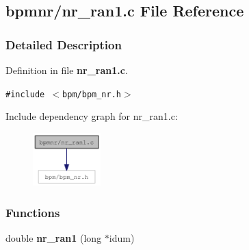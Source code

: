 \subsection{bpmnr/nr\_\-ran1.c File Reference}
\label{nr__ran1_8c}


\subsubsection{Detailed Description}


Definition in file {\bf nr\_\-ran1.c}.

{\tt \#include $<$bpm/bpm\_\-nr.h$>$}\par


Include dependency graph for nr\_\-ran1.c:\nopagebreak
\begin{figure}[H]
\begin{center}
\leavevmode
\includegraphics[width=74pt]{nr__ran1_8c__incl}
\end{center}
\end{figure}
\subsubsection*{Functions}
\begin{CompactItemize}
\item 
double {\bf nr\_\-ran1} (long $\ast$idum)
\end{CompactItemize}
